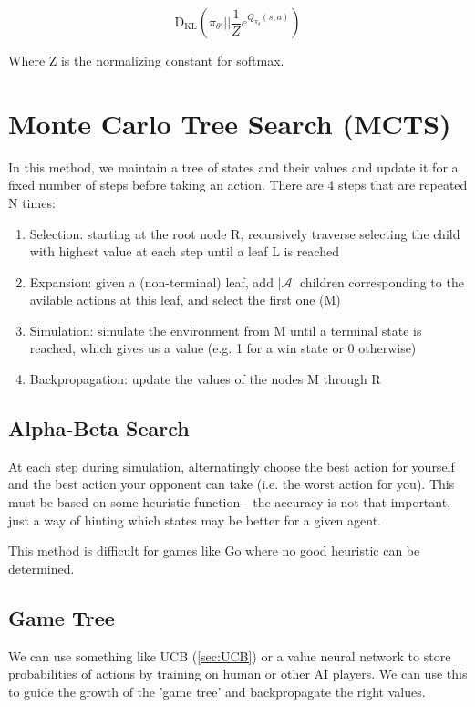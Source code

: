\documentclass[11pt]{report}
\begin{document}
\begin{equation}
	\label{eqn:sac-min}
	\text{D}_{\text{KL}}\left(\pi_{\theta'} || \frac{1}{Z}e^{Q_{\pi_\theta}(s, a)}\right)
\end{equation}

Where Z is the normalizing constant for softmax.


\section{Monte Carlo Tree Search (MCTS)}
In this method, we maintain a tree of states and their values and update it for a fixed number of steps before taking an action. There are 4 steps that are repeated N times:

\begin{enumerate}
	\item Selection: starting at the root node R, recursively traverse selecting the child with highest value at each step until a leaf L is reached
	\item Expansion: given a (non-terminal) leaf, add $|\mathcal{A}|$ children corresponding to the avilable actions at this leaf, and select the first one (M)
	\item Simulation: simulate the environment from M until a terminal state is reached, which gives us a value (e.g. 1 for a win state or 0 otherwise)
	\item Backpropagation: update the values of the nodes M through R
\end{enumerate}

\subsection{Alpha-Beta Search}
At each step during simulation, alternatingly choose the best action for yourself and the best action your opponent can take (i.e. the worst action for you). This must be based on some heuristic function - the accuracy is not that important, just a way of hinting which states may be better for a given agent.

This method is difficult for games like Go where no good heuristic can be determined.

\subsection{Game Tree}
We can use something like UCB (\autoref{sec:UCB}) or a value neural network to store probabilities of actions by training on human or other AI players. We can use this to guide the growth of the 'game tree' and backpropagate the right values.
\end{document}
